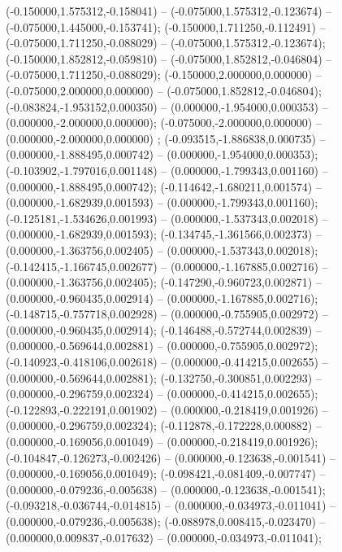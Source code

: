  (-0.150000,1.575312,-0.158041) -- (-0.075000,1.575312,-0.123674) -- (-0.075000,1.445000,-0.153741);
 (-0.150000,1.711250,-0.112491) -- (-0.075000,1.711250,-0.088029) -- (-0.075000,1.575312,-0.123674);
 (-0.150000,1.852812,-0.059810) -- (-0.075000,1.852812,-0.046804) -- (-0.075000,1.711250,-0.088029);
 (-0.150000,2.000000,0.000000) -- (-0.075000,2.000000,0.000000) -- (-0.075000,1.852812,-0.046804);
 (-0.083824,-1.953152,0.000350) -- (0.000000,-1.954000,0.000353) -- (0.000000,-2.000000,0.000000);
 (-0.075000,-2.000000,0.000000) -- (0.000000,-2.000000,0.000000) ;
 (-0.093515,-1.886838,0.000735) -- (0.000000,-1.888495,0.000742) -- (0.000000,-1.954000,0.000353);
 (-0.103902,-1.797016,0.001148) -- (0.000000,-1.799343,0.001160) -- (0.000000,-1.888495,0.000742);
 (-0.114642,-1.680211,0.001574) -- (0.000000,-1.682939,0.001593) -- (0.000000,-1.799343,0.001160);
 (-0.125181,-1.534626,0.001993) -- (0.000000,-1.537343,0.002018) -- (0.000000,-1.682939,0.001593);
 (-0.134745,-1.361566,0.002373) -- (0.000000,-1.363756,0.002405) -- (0.000000,-1.537343,0.002018);
 (-0.142415,-1.166745,0.002677) -- (0.000000,-1.167885,0.002716) -- (0.000000,-1.363756,0.002405);
 (-0.147290,-0.960723,0.002871) -- (0.000000,-0.960435,0.002914) -- (0.000000,-1.167885,0.002716);
 (-0.148715,-0.757718,0.002928) -- (0.000000,-0.755905,0.002972) -- (0.000000,-0.960435,0.002914);
 (-0.146488,-0.572744,0.002839) -- (0.000000,-0.569644,0.002881) -- (0.000000,-0.755905,0.002972);
 (-0.140923,-0.418106,0.002618) -- (0.000000,-0.414215,0.002655) -- (0.000000,-0.569644,0.002881);
 (-0.132750,-0.300851,0.002293) -- (0.000000,-0.296759,0.002324) -- (0.000000,-0.414215,0.002655);
 (-0.122893,-0.222191,0.001902) -- (0.000000,-0.218419,0.001926) -- (0.000000,-0.296759,0.002324);
 (-0.112878,-0.172228,0.000882) -- (0.000000,-0.169056,0.001049) -- (0.000000,-0.218419,0.001926);
 (-0.104847,-0.126273,-0.002426) -- (0.000000,-0.123638,-0.001541) -- (0.000000,-0.169056,0.001049);
 (-0.098421,-0.081409,-0.007747) -- (0.000000,-0.079236,-0.005638) -- (0.000000,-0.123638,-0.001541);
 (-0.093218,-0.036744,-0.014815) -- (0.000000,-0.034973,-0.011041) -- (0.000000,-0.079236,-0.005638);
 (-0.088978,0.008415,-0.023470) -- (0.000000,0.009837,-0.017632) -- (0.000000,-0.034973,-0.011041);
